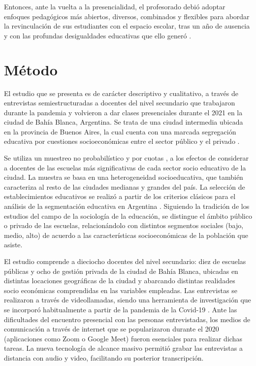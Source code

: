 \documentclass[spanish]{textolivre}
\begin{document}
Entonces, ante la vuelta a la presencialidad, el profesorado debió adoptar enfoques pedagógicos más abiertos, diversos, combinados y flexibles \cite{garcia_aretio_covid-19_2021} para abordar la revinculación de sus estudiantes con el espacio escolar, tras un año de ausencia y con las profundas desigualdades educativas que ello generó \cite{anderete_schwal_desigualdades_2021}.


\section{Método}\label{sec-modelo}
El estudio que se presenta es de carácter descriptivo y cualitativo, a través de entrevistas semiestructuradas a docentes del nivel secundario que trabajaron durante la pandemia y volvieron a dar clases presenciales durante el 2021 en la ciudad de Bahía Blanca, Argentina. Se trata de una ciudad intermedia ubicada en la provincia de Buenos Aires, la cual cuenta con una marcada segregación educativa por cuestiones socioeconómicas entre el sector público y el privado \cite{formichella_condiciones_2019}.

Se utiliza un muestreo no probabilístico y por cuotas \cite{hernandez_sampiero_metodologiinvestigacion:_2018}, a los efectos de considerar a docentes de las escuelas más significativas de cada sector socio educativo de la ciudad. La muestra se basa en una heterogeneidad socioeducativa, que también caracteriza al resto de las ciudades medianas y grandes del país. La selección de establecimientos educativos se realizó a partir de los criterios clásicos para el análisis de la segmentación educativa en Argentina \cite{braslavsky_discriminacion_1985}. Siguiendo la tradición de los estudios del campo de la sociología de la educación, se distingue el ámbito público o privado de las escuelas, relacionándolo con distintos segmentos sociales (bajo, medio, alto) de acuerdo a las características socioeconómicas de la población que asiste.

El estudio comprende a dieciocho docentes del nivel secundario: diez de escuelas públicas y ocho de gestión privada de la ciudad de Bahía Blanca, ubicadas en distintas locaciones geográficas de la ciudad y abarcando distintas realidades socio económicas comprendidas en las variables empleadas. Las entrevistas se realizaron a través de videollamadas, siendo una herramienta de investigación que se incorporó habitualmente a partir de la pandemia de la Covid-19 \cite{schmidt_entrevistas_2020}. Ante las dificultades del encuentro presencial con las personas entrevistadas, los medios de comunicación a través de internet que se popularizaron durante el 2020 (aplicaciones como Zoom o Google Meet) fueron esenciales para realizar dichas tareas. La nueva tecnología de alcance masivo permitió grabar las entrevistas a distancia con audio y video, facilitando su posterior transcripción.
\end{document}
